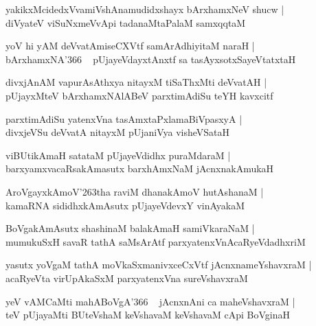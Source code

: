 \documentclass[twoside,12pt,openright]{book}
\def\S{\char'263}
\newcounter{shloka}[chapter]
\begin{document}
\begin{shloka}
yakikxMcidedxVvamiVshAnamudidxshayx bArxhamxNeV shucw |\\
diVyateV viSuNxmeVvApi tadanaMtaPalaM samxqqtaM 
\end{shloka}

\begin{shloka}
yoV hi yAM deVvatAmiseCXVtf samArAdhiyitaM naraH |\\
bArxhamxNA\char'366 ~ pUjayeVdayxtAnxtf sa tasAyxsotxSayeVtatxtaH  
\end{shloka}

\begin{shloka}
divxjAnAM vapurAsAthxya nitayxM tiSaThxMti deVvatAH |\\
pUjayxMteV bArxhamxNAlABeV parxtimAdiSu teYH kavxcitf 
\end{shloka}

\begin{shloka}
parxtimAdiSu yatenxVna tasAmxtaPxlamaBiVpasxyA |\\
divxjeVSu deVvatA nitayxM pUjaniVya visheVSataH 
\end{shloka}

\begin{shloka}
viBUtikAmaH satataM pUjayeVdidhx puraMdaraM |\\
barxyamxvacaRsakAmasutx barxhAmxNaM jAcnxnakAmukaH 
\end{shloka}

\begin{shloka}
AroVgayxkAmoV\S tha raviM dhanakAmoV hutAshanaM |\\
kamaRNA sididhxkAmAsutx pUjayeVdevxY vinAyakaM 
\end{shloka}

\begin{shloka}
BoVgakAmAsutx shashinaM balakAmaH samiVkaraNaM |\\
mumukuSxH savaR tathA saMsArAtf parxyatenxVnAcaRyeVdadhxriM 
\end{shloka}

\begin{shloka}
yasutx yoVgaM tathA moVkaSxmanivxceCxVtf jAcnxnameYshavxraM |\\
acaRyeVta virUpAkaSxM parxyatenxVna sureVshavxraM 
\end{shloka}

\begin{shloka}
yeV vAMCaMti mahABoVgA\char'366 ~ jAcnxnAni ca maheVshavxraM |\\
teV pUjayaMti BUteVshaM keVshavaM keVshavaM cApi BoVginaH 
\end{shloka}
\end{document}
